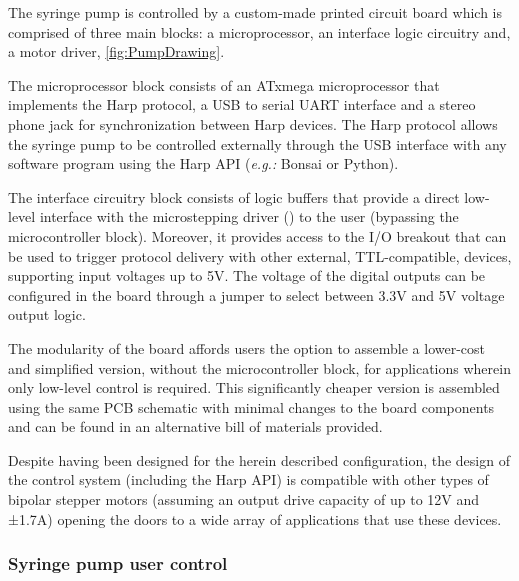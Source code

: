 The syringe pump is controlled by a custom-made printed circuit board which is comprised of three main blocks: a microprocessor, an interface logic circuitry and, a motor driver, \ref{fig:PumpDrawing}.

The microprocessor block consists of an ATxmega microprocessor that implements the Harp  protocol, a USB to serial UART interface and a stereo phone jack for synchronization between Harp devices. The Harp protocol allows the syringe pump to be controlled externally through the USB interface with any software program using the Harp API (\textit{e.g.:} Bonsai or Python).

The interface circuitry block consists of logic buffers that provide a direct low-level interface with the microstepping driver () to the user (bypassing the microcontroller block). Moreover, it provides access to the I/O breakout that can be used to trigger protocol delivery with other external, TTL-compatible, devices, supporting input voltages up to 5V. The voltage of the digital outputs can be configured in the board through a jumper to select between 3.3V and 5V voltage output logic.

The modularity of the board affords users the option to assemble a lower-cost and simplified version, without the microcontroller block, for applications wherein only low-level control is required. This significantly cheaper version is assembled using the same PCB schematic with minimal changes to the board components and can be found in an alternative bill of materials provided.

Despite having been designed for the herein described configuration, the design of the control system (including the Harp API) is compatible with other types of bipolar stepper motors (assuming an output drive capacity of up to 12V and ±1.7A) opening the doors to a wide array of applications that use these devices.

\subsubsection*{Syringe pump user control}

